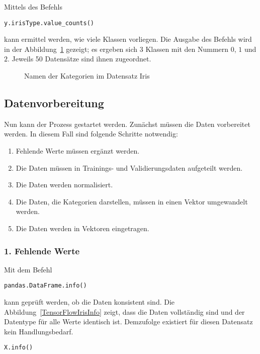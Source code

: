 Mittels des Befehls 
\begin{verbatim}
y.irisType.value_counts()
\end{verbatim}



kann ermittel werden,
wie viele Klassen vorliegen. Die Ausgabe des Befehls wird in der Abbildung~\ref{TensorFlowIrisTypes}
gezeigt; es ergeben sich 3 Klassen mit den Nummern $0$, $1$ und $2$. Jeweils 50 Datensätze sind ihnen zugeordnet.

\begin{figure}[H]
	\caption{Namen der Kategorien im Datensatz Iris}\label{TensorFlowIrisTypes}
\end{figure}


\subsection{Datenvorbereitung}
Nun kann der Prozess gestartet werden. Zunächst müssen die Daten vorbereitet werden.
In diesem Fall sind folgende Schritte notwendig: 

\begin{enumerate}
  \item Fehlende Werte müssen ergänzt werden.
  \item Die Daten müssen in Trainings- und Validierungsdaten aufgeteilt werden.
  \item Die Daten werden normalisiert.
  \item Die Daten, die Kategorien darstellen, müssen in einen Vektor umgewandelt werden.
  \item Die Daten werden in Vektoren eingetragen.
\end{enumerate}
	
\subsubsection{1. Fehlende Werte}

Mit dem Befehl 
\begin{verbatim}
pandas.DataFrame.info()
\end{verbatim}
 kann geprüft werden, ob die Daten
konsistent sind. Die Abbildung~\ref{TensorFlowIrisInfo} zeigt, dass die Daten vollständig sind und
der Datentype für alle Werte identisch ist. Demzufolge existiert für diesen Datensatz kein Handlungsbedarf.

\begin{verbatim}
X.info()
\end{verbatim}

